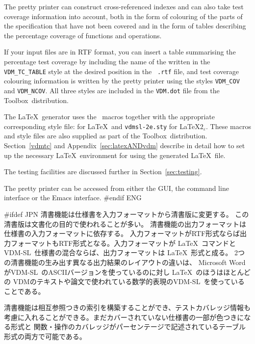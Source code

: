 \documentclass[\pformat,12pt]{article}
\newcommand{\vdmslpp}{VDM-SL}
\newcommand{\Toolbox}{Toolbox}
\newcommand{\VdmSlPp}{\VdmSl}
\newcommand{\vdmslpp}{VDM++}
\newcommand{\Toolbox}{Toolbox}
\DeclareRobustCommand{\VdmSlPp}{VDM++-\VdmSl}
\begin{document}
The pretty printer can construct cross-referenced indexes and can also
take test coverage information into account, both in the form of
colouring of the parts of the specification that have not been covered
and in the form of tables describing the percentage coverage of
functions and operations.

If your input files are in  RTF format, you can insert a table
summarising the percentage test coverage by including the name of the
 written in the
\texttt{VDM\_TC\_TABLE} style at the desired position in the {\tt
  .rtf} file, and test coverage colouring information is written by the
pretty printer using the styles \texttt{VDM\_COV} and
\texttt{VDM\_NCOV}. All three styles are included in the {\tt VDM.dot} 
file from the \Toolbox\ distribution.

The \LaTeX\ generator uses the \VdmSlPp\ macros together with the
appropriate corresponding style file:
 for \LaTeX\ and 
{\tt vdmsl-2e.sty} for \LaTeX$2_{\varepsilon}$. These macros and style
files are also supplied as part of the \Toolbox\
distribution. Section~\ref{vdmtc} and Appendix~\ref{sec:latexANDvdm}
describe in detail how to set up the necessary \LaTeX\ environment for
using the generated \LaTeX\ file.

The testing facilities are discussed further in
Section~\ref{sec:testing}.

The pretty printer can be accessed from either the GUI, the
command line interface or the Emacs interface.
#endif ENG

#ifdef JPN
清書機能は仕様書を入力フォーマットから清書版に変更する。
この清書版は文書化の目的で使われることが多い。
清書機能の出力フォーマットは仕様書の入力フォーマットに依存する。
入力フォーマットがRTF形式ならば出力フォーマットもRTF形式となる。入力フォーマットが
 \LaTeX\ コマンドと\vdmslpp\ 仕様書の混合ならば、出力フォーマットは \LaTeX\ 形式と成る。
2つの清書機能の生み出す異なる出力結果のレイアウトの違いは、
Microsoft Wordが\vdmslpp\ のASCIIバージョンを使っているのに対し \LaTeX\ のほうはほとんどの
VDMのテキストや論文で使われている数学的表現の\vdmslpp\ を使っていることである。

清書機能は相互参照つきの索引を構築することができ、テストカバレッジ情報も
考慮に入れることができる。まだカバーされていない仕様書の一部が色つきになる形式と
関数・操作のカバレッジがパーセンテージで記述されているテーブル形式の両方で可能である。
\end{document}
